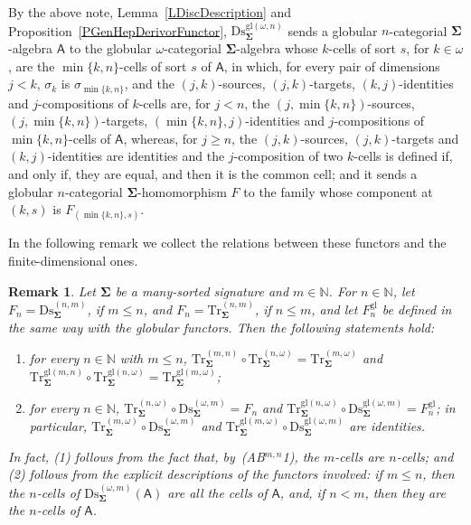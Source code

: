 \documentclass[a4paper, reqno
]{amsart}
\newcommand{\sig}[1]{\mathbf{#1}}             %
\newcommand{\calg}[1]{\boldsymbol{\mathsf{#1}}} %
\newcommand{\gl}{\mathrm{gl}}                %
\newcommand{\Ds}{\mathrm{Ds}}
\newcommand{\Tr}{\mathrm{Tr}}
\theoremstyle{plain}
\newtheorem{remark}[theorem]{Remark}
\theoremstyle{definition}
\begin{document}
By the above note, Lemma~\ref{LDiscDescription} and Proposition~\ref{PGenHepDerivorFunctor}, $\Ds^{\gl(\omega,n)}_{\sig{\Sigma}}$ sends a globular $n$-categorial $\sig{\Sigma}$-algebra $\calg{A}$ to the globular $\omega$-categorial $\sig{\Sigma}$-algebra whose $k$-cells of sort $s$, for $k\in\omega$, are the $\min\{k,n\}$-cells of sort $s$ of $\calg{A}$, in which, for every pair of dimensions $j<k$, $\sigma_{k}$ is $\sigma_{\min\{k,n\}}$, and the $(j,k)$-sources, $(j,k)$-targets, $(k,j)$-identities and $j$-compositions of $k$-cells are, for $j<n$, the $(j,\min\{k,n\})$-sources, $(j,\min\{k,n\})$-targets, $(\min\{k,n\},j)$-identities and $j$-compositions of $\min\{k,n\}$-cells of $\calg{A}$, whereas, for $j\geq n$, the $(j,k)$-sources, $(j,k)$-targets and $(k,j)$-identities are identities and the $j$-composition of two $k$-cells is defined if, and only if, they are equal, and then it is the common cell; and it sends a globular $n$-categorial $\sig{\Sigma}$-homomorphism $F$ to the family whose component at $(k,s)$ is $F_{(\min\{k,n\},s)}$.

In the following remark we collect the relations between these functors and the finite-dimensional ones.

\begin{remark}\label{RDiscOmegaTrunc}
Let $\sig{\Sigma}$ be a many-sorted signature and $m\in\mathbb{N}$.
For $n\in\mathbb{N}$, let $F_{n}=\Ds^{(n,m)}_{\sig{\Sigma}}$, if $m\leq n$, and $F_{n}=\Tr^{(n,m)}_{\sig{\Sigma}}$, if $n\leq m$, and let $F^{\gl}_{n}$ be defined in the same way with the globular functors.
Then the following statements hold:
\begin{enumerate}
\item for every $n\in\mathbb{N}$ with $m\leq n$, $\Tr^{(m,n)}_{\sig{\Sigma}}\circ\Tr^{(n,\omega)}_{\sig{\Sigma}}=\Tr^{(m,\omega)}_{\sig{\Sigma}}$ and $\Tr^{\gl(m,n)}_{\sig{\Sigma}}\circ\Tr^{\gl(n,\omega)}_{\sig{\Sigma}}=\Tr^{\gl(m,\omega)}_{\sig{\Sigma}}$;
\item for every $n\in\mathbb{N}$, $\Tr^{(n,\omega)}_{\sig{\Sigma}}\circ\Ds^{(\omega,m)}_{\sig{\Sigma}}=F_{n}$ and $\Tr^{\gl(n,\omega)}_{\sig{\Sigma}}\circ\Ds^{\gl(\omega,m)}_{\sig{\Sigma}}=F^{\gl}_{n}$; in particular, $\Tr^{(m,\omega)}_{\sig{\Sigma}}\circ\Ds^{(\omega,m)}_{\sig{\Sigma}}$ and $\Tr^{\gl(m,\omega)}_{\sig{\Sigma}}\circ\Ds^{\gl(\omega,m)}_{\sig{\Sigma}}$ are identities.
\end{enumerate}
In fact, (1) follows from the fact that, by~(AB$^{m,n}$1), the $m$-cells are $n$-cells; and (2) follows from the explicit descriptions of the functors involved: if $m\leq n$, then the $n$-cells of $\Ds^{(\omega,m)}_{\sig{\Sigma}}(\calg{A})$ are all the cells of $\calg{A}$, and, if $n<m$, then they are the $n$-cells of $\calg{A}$.
\end{remark}
\end{document}
